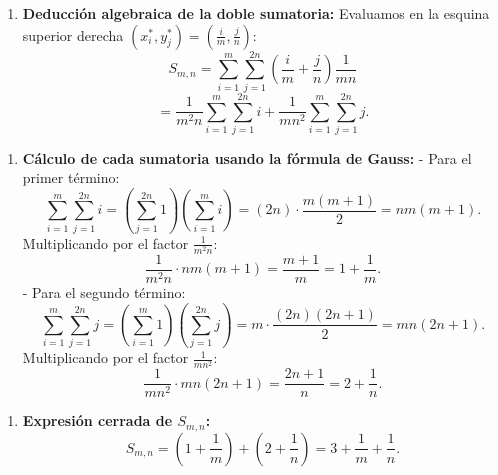 \documentclass[11pt,a4paper]{article}
\begin{document}
\begin{enumerate}[label=\textbf{\arabic*.}]
\item \textbf{Deducción algebraica de la doble sumatoria:}
Evaluamos en la esquina superior derecha $(x_i^*, y_j^*) = \left(\frac{i}{m}, \frac{j}{n}\right)$:
\begin{equation*}
S_{m,n} = \sum_{i=1}^m \sum_{j=1}^{2n} \left(\frac{i}{m} + \frac{j}{n}\right) \frac{1}{mn}
\end{equation*}
\begin{equation*}
= \frac{1}{m^2 n} \sum_{i=1}^m \sum_{j=1}^{2n} i + \frac{1}{m n^2} \sum_{i=1}^m \sum_{j=1}^{2n} j.
\end{equation*}
\end{enumerate}

\begin{enumerate}[label=\textbf{\arabic*.}]
\item \textbf{Cálculo de cada sumatoria usando la fórmula de Gauss:}
- Para el primer término:
\begin{equation*}
\sum_{i=1}^m \sum_{j=1}^{2n} i = \left(\sum_{j=1}^{2n} 1\right) \left(\sum_{i=1}^m i\right) = (2n) \cdot \frac{m(m+1)}{2} = n m (m + 1).
\end{equation*}
Multiplicando por el factor $\frac{1}{m^2 n}$:
\begin{equation*}
\frac{1}{m^2 n} \cdot n m (m + 1) = \frac{m + 1}{m} = 1 + \frac{1}{m}.
\end{equation*}
- Para el segundo término:
\begin{equation*}
\sum_{i=1}^m \sum_{j=1}^{2n} j = \left(\sum_{i=1}^m 1\right) \left(\sum_{j=1}^{2n} j\right) = m \cdot \frac{(2n)(2n + 1)}{2} = m n (2n + 1).
\end{equation*}
Multiplicando por el factor $\frac{1}{m n^2}$:
\begin{equation*}
\frac{1}{m n^2} \cdot m n (2n + 1) = \frac{2n + 1}{n} = 2 + \frac{1}{n}.
\end{equation*}
\end{enumerate}

\begin{enumerate}[label=\textbf{\arabic*.}]
\item \textbf{Expresión cerrada de $S_{m,n}$:}
\begin{equation*}
S_{m,n} = \left(1 + \frac{1}{m}\right) + \left(2 + \frac{1}{n}\right) = 3 + \frac{1}{m} + \frac{1}{n}.
\end{equation*}
\end{enumerate}
\end{document}
